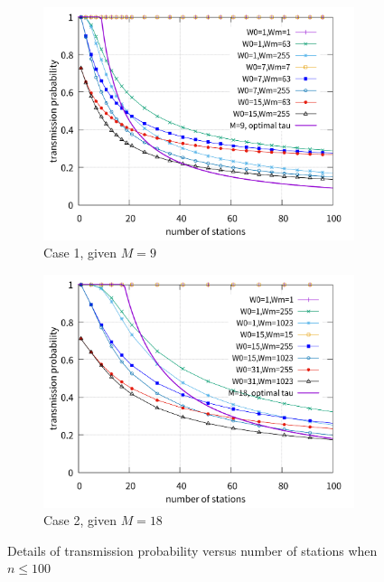 \documentclass[journal]{IEEEtran}
\begin{document}
\begin{figure}[!ht]
\centering
\begin{subfigure}{0.5\textwidth}
\centering
\includegraphics[scale=.38]{./figure/Section_perf_eval/tau/n_tau_perf_M9_x100.pdf}
\caption{Case 1, given $M=9$}
\label{fig_tau_n_M9_detail}
\end{subfigure}

\begin{subfigure}{0.5\textwidth}
\centering
\includegraphics[scale=.38]{./figure/Section_perf_eval/tau/n_tau_perf_M18_x100.pdf}
\caption{Case 2, given $M=18$}
\label{fig_tau_n_M18_detail}
\end{subfigure}

\caption{Details of transmission probability versus number of stations when $n\leq 100$}
\label{fig_tau_n_detail}
\end{figure}
\end{document}
